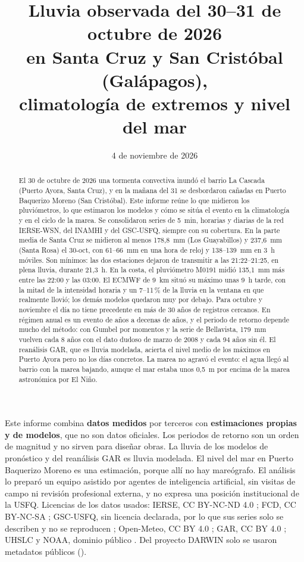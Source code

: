 \documentclass{sosg-informe}
\title{Lluvia observada del 30--31 de octubre de 2026\\en Santa Cruz y San Cristóbal (Galápagos),\\climatología de extremos y nivel del mar}
\date{4 de noviembre de 2026}
\begin{document}
\maketitle

\begin{abstract}
El 30 de octubre de 2026 una tormenta convectiva inundó el barrio La Cascada (Puerto Ayora, Santa Cruz), y en la mañana del 31 se desbordaron cañadas en Puerto Baquerizo Moreno (San Cristóbal). Este informe reúne lo que midieron los pluviómetros, lo que estimaron los modelos y cómo se sitúa el evento en la climatología y en el ciclo de la marea. Se consolidaron series de 5~min, horarias y diarias de la red IERSE-WSN, del INAMHI y del GSC-USFQ, siempre con su cobertura. En la parte media de Santa Cruz se midieron al menos 178,8~mm (Los Guayabillos) y 237,6~mm (Santa Rosa) el 30-oct, con 61--66~mm en una hora de reloj y 138--139~mm en 3~h móviles. Son mínimos: las dos estaciones dejaron de transmitir a las 21:22--21:25, en plena lluvia, durante 21,3~h. En la costa, el pluviómetro M0191 midió 135,1~mm más entre las 22:00 y las 03:00. El ECMWF de 9~km situó su máximo unas 9~h tarde, con la mitad de la intensidad horaria y un 7--11\,\% de la lluvia en la ventana en que realmente llovió; los demás modelos quedaron muy por debajo. Para octubre y noviembre el día no tiene precedente en más de 30 años de registros cercanos. En régimen anual es un evento de años a decenas de años, y el periodo de retorno depende mucho del método: con Gumbel por momentos y la serie de Bellavista, 179~mm vuelven cada 8 años con el dato dudoso de marzo de 2008 y cada 94 años sin él. El reanálisis GAR, que es lluvia modelada, acierta el nivel medio de los máximos en Puerto Ayora pero no los días concretos. La marea no agravó el evento: el agua llegó al barrio con la marea bajando, aunque el mar estaba unos 0,5~m por encima de la marea astronómica por El Niño.
\end{abstract}

\begin{aviso}
Este informe combina \textbf{datos medidos} por terceros con \textbf{estimaciones propias y de modelos}, que no son datos oficiales. Los periodos de retorno son un orden de magnitud y no sirven para diseñar obras. La lluvia de los modelos de pronóstico y del reanálisis GAR es lluvia modelada. El nivel del mar en Puerto Baquerizo Moreno es una estimación, porque allí no hay mareógrafo. El análisis lo preparó un equipo asistido por agentes de inteligencia artificial, sin visitas de campo ni revisión profesional externa, y no expresa una posición institucional de la USFQ. Licencias de los datos usados: IERSE, CC BY-NC-ND 4.0 \citep{ierse2023}; FCD, CC BY-NC-SA \citep{fcd2026}; GSC-USFQ, sin licencia declarada, por lo que sus series solo se describen y no se reproducen \citep[;][]{gsc2026}; Open-Meteo, CC BY 4.0 \citep{zippenfenig2023}; GAR, CC BY 4.0 \citep{schmidt2025}; UHSLC y NOAA, dominio público \citep{caldwell2015,huang2021}. Del proyecto DARWIN solo se usaron metadatos públicos ().
\end{aviso}
\end{document}
